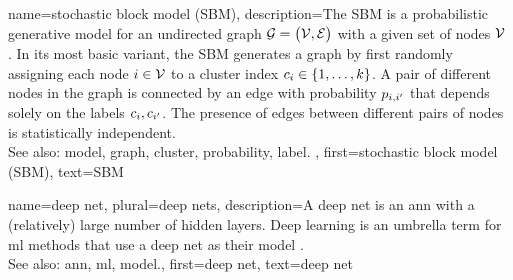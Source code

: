 {name={stochastic block model (SBM)},
	description={The SBM is a 
		probabilistic generative \gls{model} for an undirected \gls{graph} $\mathcal{G} = \big( \mathcal{V}, \mathcal{E} \big)$ 
		with a given set of nodes $\mathcal{V}$ \cite{AbbeSBM2018}. In its most basic variant, 
		the SBM generates a \gls{graph} by first randomly assigning each node $i \in \mathcal{V}$ to 
		a \gls{cluster} index $c_{i} \in \{1,\ldots,k\}$. A pair of different nodes in the 
		\gls{graph} is connected by an edge with \gls{probability} $p_{i,i'}$ that depends 
		solely on the \glspl{label} $c_{i}, c_{i'}$. 
		The presence of edges between different pairs of 
		nodes is statistically independent.
					\\ 
		See also: \gls{model}, \gls{graph}, \gls{cluster}, \gls{probability}, \gls{label}. },
	first={stochastic block model (SBM)},
	text={SBM} 
}

{name={deep net}, plural={deep nets},
	description={A deep net is an \gls{ann} with a (relatively) large number of 
		hidden layers. Deep learning is an umbrella term for \gls{ml} methods that use a deep 
		net as their \gls{model} \cite{Goodfellow-et-al-2016}.
				\\ 
		See also: \gls{ann}, \gls{ml}, \gls{model}.},
	first={deep net},
	text={deep net} 
}

\newcommand{\gaussiancenter}{3}

